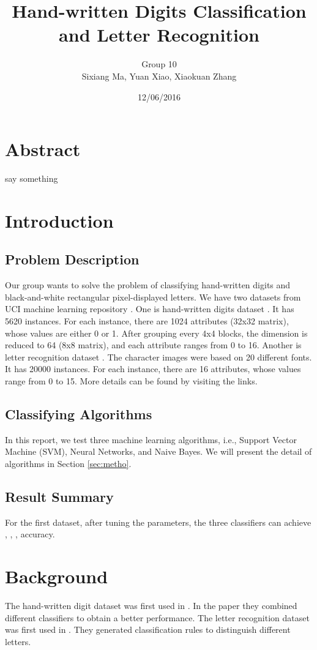 \documentclass[11pt]{article}
\title{Hand-written Digits Classification and Letter Recognition}
\author{Group 10 \\ Sixiang Ma, Yuan Xiao, Xiaokuan Zhang}
\date{12/06/2016}
\begin{document}
\maketitle
\section*{Abstract}
say something

\section{Introduction}

\subsection{Problem Description}
Our group wants to solve the problem of classifying hand-written digits and  black-and-white rectangular pixel-displayed letters. We have two datasets from UCI machine learning repository \cite{Lichman2013}. One is hand-written digits dataset \cite{digitdataset}. It has 5620 instances. For each instance, there are 1024 attributes (32x32 matrix), whose values are either 0 or 1. After grouping every 4x4 blocks, the dimension is reduced to 64 (8x8 matrix), and each attribute ranges from 0 to 16. Another is letter recognition dataset \cite{letterdataset}. The character images were based on 20 different fonts. It has 20000 instances. For each instance, there are 16 attributes, whose values range from 0 to 15. More details can be found by visiting the links.

\subsection{Classifying Algorithms}
In this report, we test three machine learning  algorithms, i.e., Support Vector Machine (SVM), Neural Networks, and Naive Bayes. We will present the detail of algorithms in Section \ref{sec:metho}.
\subsection{Result Summary}
For the first dataset, after tuning the parameters, the three classifiers can achieve , , , accuracy. 

\section{Background}
The hand-written digit dataset was first used in \cite{kaynak1995methods}. In the paper they combined different classifiers to obtain a better performance.  The letter recognition dataset was first used in \cite{frey1991letter}. They generated classification rules to distinguish different letters.
\end{document}
